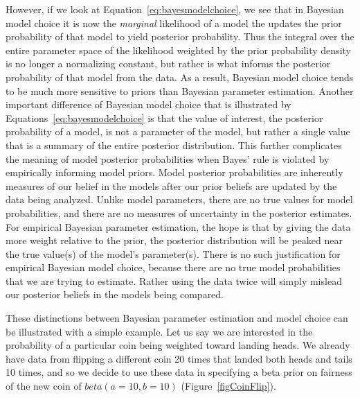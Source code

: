 However, if we look at Equation~\ref{eq:bayesmodelchoice}, we see that in
Bayesian model choice it is now the \emph{marginal} likelihood of a model
the updates the prior probability of that model to yield posterior
probability.
Thus the integral over the entire parameter space of the likelihood weighted by
the prior probability density is no longer a normalizing constant, but rather
is what informs the posterior probability of that model from the data.
As a result, Bayesian model choice tends to be much more sensitive to priors
than Bayesian parameter estimation.
Another important difference of Bayesian model choice that is illustrated by
Equations~\ref{eq:bayesmodelchoice} is that the value of interest, the
posterior probability of a model, is not a parameter of the model, but rather a
single value that is a summary of the entire posterior distribution.
This further complicates the meaning of model posterior probabilities when
Bayes' rule is violated by empirically informing model priors.
Model posterior probabilities are inherently measures of our belief in
the models after our prior beliefs are updated by the data being analyzed.
Unlike model parameters, there are no true values for model probabilities,
and there are no measures of uncertainty in the posterior estimates. 
For empirical Bayesian parameter estimation, the hope is that by giving the
data more weight relative to the prior, the posterior distribution will be
peaked near the true value(s) of the model's parameter(s).
There is no such justification for empirical Bayesian model choice, because
there are no true model probabilities that we are trying to estimate.
Rather using the data twice will simply mislead our posterior
beliefs in the models being compared.

These distinctions between Bayesian parameter estimation and model choice can
be illustrated with a simple example.
Let us say we are interested in the probability of a particular coin
being weighted toward landing heads.
We already have data from flipping a different coin 20 times
that landed both heads and tails 10 times, and so we decide to use
these data in specifying a beta prior on fairness of the new coin of
$beta(a=10, b=10)$ (Figure~\ref{figCoinFlip}).

